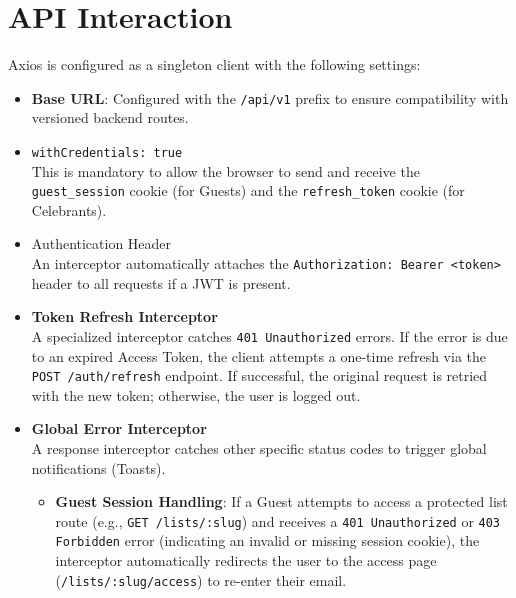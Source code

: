 \section{API Interaction}
Axios is configured as a singleton client with the following settings:
\begin{itemize}
    \item \textbf{Base URL}: Configured with the \texttt{/api/v1} prefix to ensure compatibility with versioned backend routes.
    \item \texttt{withCredentials: true} \\
        This is mandatory to allow the browser to send and receive the \texttt{guest\_session} cookie (for Guests) and the \texttt{refresh\_token} cookie (for Celebrants).
    \item Authentication Header \\
        An interceptor automatically attaches the \texttt{Authorization: Bearer <token>} header to all requests if a JWT is present.
    \item \textbf{Token Refresh Interceptor} \\
        A specialized interceptor catches \texttt{401 Unauthorized} errors. If the error is due to an expired Access Token, the client attempts a one-time refresh via the \texttt{POST /auth/refresh} endpoint. If successful, the original request is retried with the new token; otherwise, the user is logged out.
    \item \textbf{Global Error Interceptor} \\
        A response interceptor catches other specific status codes to trigger global notifications (Toasts).
        \begin{itemize}
            \item \textbf{Guest Session Handling}: If a Guest attempts to access a protected list route (e.g., \texttt{GET /lists/:slug}) and receives a \texttt{401 Unauthorized} or \texttt{403 Forbidden} error (indicating an invalid or missing session cookie), the interceptor automatically redirects the user to the access page (\texttt{/lists/:slug/access}) to re-enter their email.
        \end{itemize}
\end{itemize}

